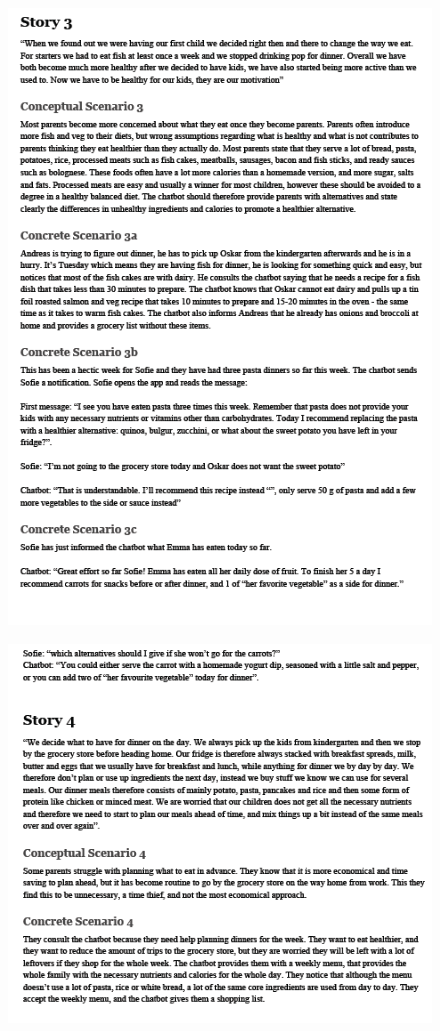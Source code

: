     \begin{figure}[H]
        \centering
        \includegraphics[scale=0.8]{figures/UScen3.png}
    \end{figure}
    \begin{figure}[H]
        \centering
        \includegraphics[scale=0.8]{figures/UScen4.png}
    \end{figure}
    
